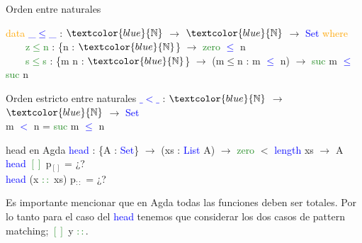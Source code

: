 \documentclass[xcolor=dvipsnames]{beamer} %
\newcommand{\cf}[1]{\textcolor{blue}{#1}}
\newcommand{\ct}[1]{\textcolor{blue}{#1}}
\newcommand{\cc}[1]{\textcolor{ForestGreen}{#1}}
\newcommand{\ck}[1]{\textcolor{orange}{#1}}
\newcommand{\N}{\ct{\mathbb{N}}}
\newcommand{\ra}{\rightarrow}
\begin{document}
\begin{frame}[shrink=5]

\begin{block}{Orden entre naturales}

\ck{data} \ct{\_$\leq$\_} : $\N$ $\ra$ $\N$ $\ra$ \ct{Set} \ck{where}\\
\ \ \ \ \cc{z$\leq$n} : \{n : $\N$\}                 $\ra$ \cc{zero}  \ct{$\leq$} n\\
\ \ \ \ \cc{s$\leq$s} : \{m n : $\N$\} $\ra$ (m$\leq$n : m \ct{$\leq$} n) $\ra$ \cc{suc} m \ct{$\leq$} \cc{suc} n

\end{block}

\begin{block}{Orden estricto entre naturales}
\cf{$\_<\_$} : $\N$ $\ra$ $\N$ $\ra$ \ct{Set}\\
m \cf{$<$} n = \cc{suc} m \cf{$\leq$} n
\end{block}

\begin{block}{head en Agda}
    \cf{head} : \{A : \ct{Set}\}  $\ra$ (xs : \ct{List} A) $\ra$ 
    \cc{zero} $<$ \ct{length} xs $\rightarrow$ A \\
    \pause
    \cf{head} \cc{$[]$} p$_{[]}$ = ¿?\\
    \cf{head} (x \cc{$::$} xs) p$_{::}$ = ¿?
\end{block}  

\begin{block}{}
Es importante mencionar que en Agda todas las funciones deben
ser totales. Por lo tanto para el caso del \cf{head} tenemos
que considerar los dos casos de pattern matching; \cc{$[]$} y \cc{$::$}.
\end{block}

\end{frame}
\end{document}
